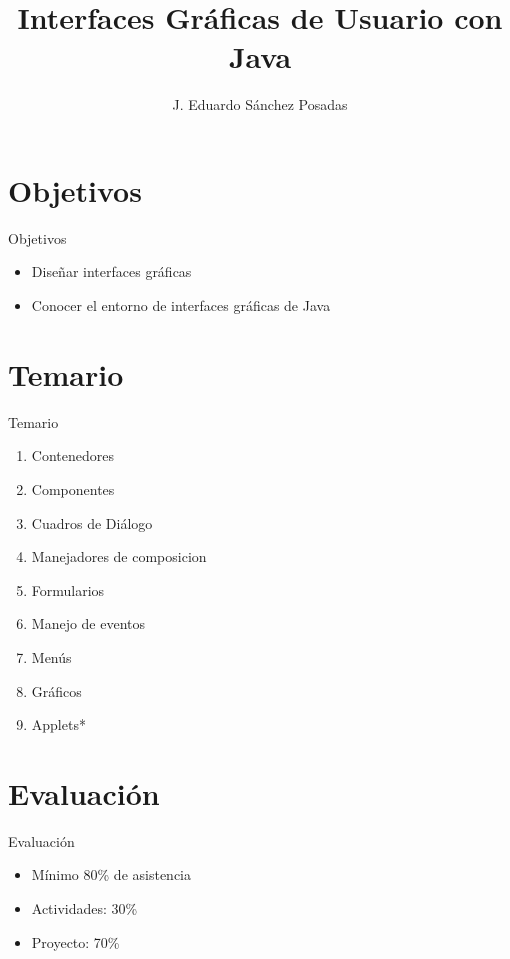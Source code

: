 \documentclass[11pt]{beamer}
\author{J. Eduardo Sánchez Posadas}
\title{Interfaces Gráficas de Usuario con Java}
\institute{FES Aragón}
\begin{document}
\begin{frame}
\titlepage
\end{frame}

\begin{frame}
\tableofcontents
\end{frame}

\section{Objetivos}
\begin{frame}{Objetivos}
\begin{itemize}
\item Diseñar interfaces gráficas
\item Conocer el entorno de interfaces gráficas de Java
\end{itemize}
\end{frame}


\section{Temario}
\begin{frame}{Temario}
\begin{enumerate}
\item Contenedores
\item Componentes
\item Cuadros de Diálogo
\item Manejadores de composicion
\item Formularios
\item Manejo de eventos
\item Menús
\item Gráficos
\item Applets*
\end{enumerate}
\end{frame}



\section{Evaluación}
\begin{frame}{Evaluación}
\begin{itemize}
\item Mínimo 80\% de asistencia
\item Actividades: 30\%
\item Proyecto: 70\%
\end{itemize}
\end{frame}
\end{document}
